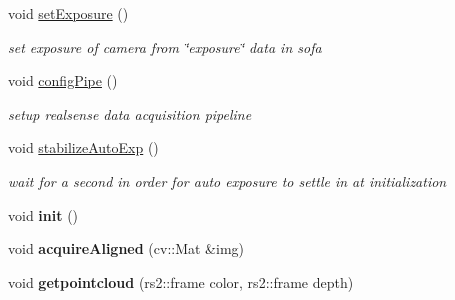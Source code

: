 \begin{DoxyCompactItemize}
\item 
\mbox{\label{classsofa_1_1rgbdtracking_1_1_real_sense_cam_ad11af2a678cdbe9d4cb69160654ddc59}} 
void \hyperlink{classsofa_1_1rgbdtracking_1_1_real_sense_cam_ad11af2a678cdbe9d4cb69160654ddc59}{set\+Exposure} ()
\begin{DoxyCompactList}\small\item\em set exposure of camera from \char`\"{}exposure\char`\"{} data in sofa \end{DoxyCompactList}\item 
\mbox{\label{classsofa_1_1rgbdtracking_1_1_real_sense_cam_a60647ccc41e670ac3f5d7ad8b5d96194}} 
void \hyperlink{classsofa_1_1rgbdtracking_1_1_real_sense_cam_a60647ccc41e670ac3f5d7ad8b5d96194}{config\+Pipe} ()
\begin{DoxyCompactList}\small\item\em setup realsense data acquisition pipeline \end{DoxyCompactList}\item 
\mbox{\label{classsofa_1_1rgbdtracking_1_1_real_sense_cam_a90411168a51a6899f412391bfae3b7ed}} 
void \hyperlink{classsofa_1_1rgbdtracking_1_1_real_sense_cam_a90411168a51a6899f412391bfae3b7ed}{stabilize\+Auto\+Exp} ()
\begin{DoxyCompactList}\small\item\em wait for a second in order for auto exposure to settle in at initialization \end{DoxyCompactList}\item 
\mbox{\label{classsofa_1_1rgbdtracking_1_1_real_sense_cam_a617df3395a331f0e4a046da1c79ab8f0}} 
void {\bfseries init} ()
\item 
\mbox{\label{classsofa_1_1rgbdtracking_1_1_real_sense_cam_a29789038ece88a4d6485c0f6d01abe70}} 
void {\bfseries acquire\+Aligned} (cv\+::\+Mat \&img)
\item 
\mbox{\label{classsofa_1_1rgbdtracking_1_1_real_sense_cam_a14c83fdb652f4d40a95a402dd930f7a9}} 
void {\bfseries getpointcloud} (rs2\+::frame color, rs2\+::frame depth)
\end{DoxyCompactItemize}



